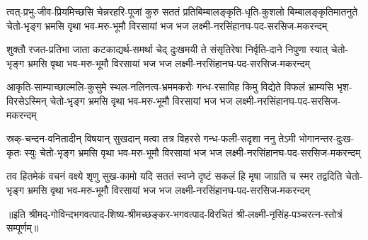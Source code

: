 

\fourlineindentedshloka
{त्वत्-प्रभु-जीव-प्रियमिच्छसि चेन्नरहरि-पूजां कुरु सततं}
{प्रतिबिम्बालङ्कृति-धृति-कुशलो बिम्बालङ्कृतिमातनुते }
{चेतो-भृङ्ग भ्रमसि वृथा भव-मरु-भूमौ विरसायां}
{भज भज लक्ष्मी-नरसिंहानघ-पद-सरसिज-मकरन्दम्}%

\fourlineindentedshloka
{शुक्तौ रजत-प्रतिभा जाता कटकाद्यर्थ-समर्था चेद्}
{दुःखमयी ते संसृतिरेषा निर्वृति-दाने निपुणा स्यात् }
{चेतो-भृङ्ग भ्रमसि वृथा भव-मरु-भूमौ विरसायां}
{भज भज लक्ष्मी-नरसिंहानघ-पद-सरसिज-मकरन्दम्}%

\fourlineindentedshloka
{आकृति-साम्याच्छाल्मलि-कुसुमे स्थल-नलिनत्व-भ्रममकरोः}
{गन्ध-रसाविह किमु विद्येते विफलं भ्राम्यसि भृश-विरसेऽस्मिन् }
{चेतो-भृङ्ग भ्रमसि वृथा भव-मरु-भूमौ विरसायां}
{भज भज लक्ष्मी-नरसिंहानघ-पद-सरसिज-मकरन्दम्}%

\fourlineindentedshloka
{स्रक्-चन्दन-वनितादीन् विषयान् सुखदान् मत्वा तत्र विहरसे}
{गन्ध-फली-सदृशा ननु तेऽमी भोगानन्तर-दुःख-कृतः स्युः }
{चेतो-भृङ्ग भ्रमसि वृथा भव-मरु-भूमौ विरसायां}
{भज भज लक्ष्मी-नरसिंहानघ-पद-सरसिज-मकरन्दम्}%

\fourlineindentedshloka
{तव हितमेकं वचनं वक्ष्ये श‍ृणु सुख-कामो यदि सततं}
{स्वप्ने दृष्टं सकलं हि मृषा जाग्रति च स्मर तद्वदिति}
{चेतो-भृङ्ग भ्रमसि वृथा भव-मरु-भूमौ विरसायां}
{भज भज लक्ष्मी-नरसिंहानघ-पद-सरसिज-मकरन्दम्}%

॥इति श्रीमद्-गोविन्दभगवत्पाद-शिष्य-श्रीमच्छङ्कर-भगवत्पाद-विरचितं श्री-लक्ष्मी-नृसिंह-पञ्चरत्न-स्तोत्रं सम्पूर्णम्॥
